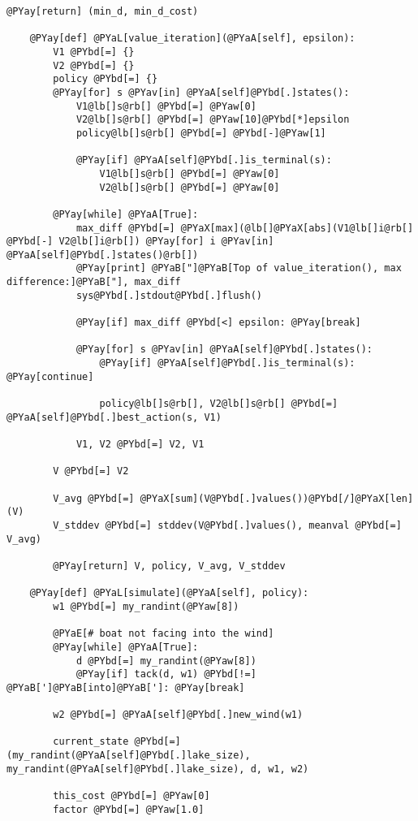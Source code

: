\begin{Verbatim}[commandchars=@\[\]]
        @PYay[return] (min_d, min_d_cost)

    @PYay[def] @PYaL[value_iteration](@PYaA[self], epsilon):
        V1 @PYbd[=] {}
        V2 @PYbd[=] {}
        policy @PYbd[=] {}
        @PYay[for] s @PYav[in] @PYaA[self]@PYbd[.]states():
            V1@lb[]s@rb[] @PYbd[=] @PYaw[0]
            V2@lb[]s@rb[] @PYbd[=] @PYaw[10]@PYbd[*]epsilon
            policy@lb[]s@rb[] @PYbd[=] @PYbd[-]@PYaw[1]

            @PYay[if] @PYaA[self]@PYbd[.]is_terminal(s):
                V1@lb[]s@rb[] @PYbd[=] @PYaw[0]
                V2@lb[]s@rb[] @PYbd[=] @PYaw[0]

        @PYay[while] @PYaA[True]:
            max_diff @PYbd[=] @PYaX[max](@lb[]@PYaX[abs](V1@lb[]i@rb[] @PYbd[-] V2@lb[]i@rb[]) @PYay[for] i @PYav[in] @PYaA[self]@PYbd[.]states()@rb[])
            @PYay[print] @PYaB["]@PYaB[Top of value_iteration(), max difference:]@PYaB["], max_diff
            sys@PYbd[.]stdout@PYbd[.]flush()

            @PYay[if] max_diff @PYbd[<] epsilon: @PYay[break]

            @PYay[for] s @PYav[in] @PYaA[self]@PYbd[.]states():
                @PYay[if] @PYaA[self]@PYbd[.]is_terminal(s): @PYay[continue]

                policy@lb[]s@rb[], V2@lb[]s@rb[] @PYbd[=] @PYaA[self]@PYbd[.]best_action(s, V1)

            V1, V2 @PYbd[=] V2, V1

        V @PYbd[=] V2

        V_avg @PYbd[=] @PYaX[sum](V@PYbd[.]values())@PYbd[/]@PYaX[len](V)
        V_stddev @PYbd[=] stddev(V@PYbd[.]values(), meanval @PYbd[=] V_avg)

        @PYay[return] V, policy, V_avg, V_stddev

    @PYay[def] @PYaL[simulate](@PYaA[self], policy):
        w1 @PYbd[=] my_randint(@PYaw[8])

        @PYaE[# boat not facing into the wind]
        @PYay[while] @PYaA[True]:
            d @PYbd[=] my_randint(@PYaw[8])
            @PYay[if] tack(d, w1) @PYbd[!=] @PYaB[']@PYaB[into]@PYaB[']: @PYay[break]

        w2 @PYbd[=] @PYaA[self]@PYbd[.]new_wind(w1)

        current_state @PYbd[=] (my_randint(@PYaA[self]@PYbd[.]lake_size), my_randint(@PYaA[self]@PYbd[.]lake_size), d, w1, w2)

        this_cost @PYbd[=] @PYaw[0]
        factor @PYbd[=] @PYaw[1.0]


\end{Verbatim}
